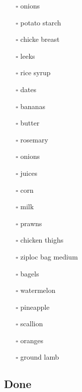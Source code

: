 \documentclass[
]{article}
\providecommand{\tightlist}{%
  \setlength{\itemsep}{0pt}\setlength{\parskip}{0pt}}
\begin{document}
\begin{itemize}
\tightlist
\item[$\square$]
  onions
\item[$\square$]
  potato starch
\item[$\square$]
  chicke breast
\item[$\square$]
  leeks
\item[$\square$]
  rice syrup
\item[$\square$]
  dates
\item[$\square$]
  bananas
\item[$\square$]
  butter
\item[$\square$]
  rosemary
\item[$\square$]
  onions
\item[$\square$]
  juices
\item[$\square$]
  corn
\item[$\square$]
  milk
\item[$\square$]
  prawns
\item[$\square$]
  chicken thighs
\item[$\square$]
  ziploc bag medium
\item[$\square$]
  bagels
\item[$\square$]
  watermelon
\item[$\square$]
  pineapple
\item[$\square$]
  scallion
\item[$\square$]
  oranges
\item[$\square$]
  ground lamb
\end{itemize}

\hypertarget{done}{%
\subsection{Done}\label{done}}
\end{document}
